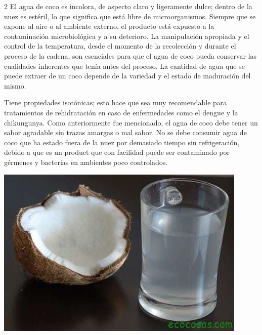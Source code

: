 \documentclass[11pt,spanish,Letterpaper,openany]{book}
\begin{document}
\begin {multicols}{2}
El agua de coco es incolora, de aspecto claro y ligeramente dulce; dentro de la nuez es estéril, lo que significa que está libre de microorganismos. Siempre que se expone al aire o al ambiente externo, el producto está expuesto a la contaminación microbiológica y a su deterioro. La manipulación apropiada y el control de la temperatura, desde el momento de la recolección y durante el proceso de la cadena, son esenciales para que el agua de coco pueda conservar las cualidades inherentes que tenía antes del proceso. La cantidad de agua que se puede extraer de un coco depende de la variedad y el estado de maduración del mismo.

Tiene propiedades isotónicas; esto hace que sea muy recomendable para tratamientos de rehidratación en caso de enfermedades como el dengue y la chikungunya. Como anteriormente fue mencionado, el agua de coco debe tener un sabor agradable sin trazas amargas o mal sabor. No se debe consumir agua de coco que ha estado fuera de la nuez por demasiado tiempo sin refrigeración, debido a que es un product que con facilidad puede ser contaminado por gérmenes y bacterias en ambientes poco controlados.

\bigskip

\begin {flushleft}
\noindent\begin{minipage}[c]{\columnwidth}

\includegraphics[width=1\linewidth]{images/201901-lcalmo-imagen01}

\end{minipage}

\end {flushleft}


\end{multicols}
\end{document}
